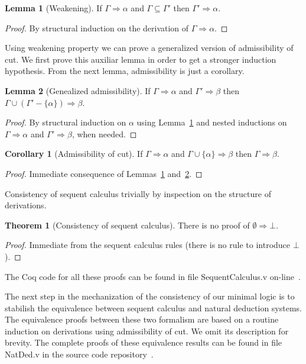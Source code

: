 \documentclass[12pt]{article}
\theoremstyle{definition}
\newtheorem{Theorem}{Theorem}
\newtheorem{Corollary}{Corollary}
\newtheorem{Lemma}{Lemma}
\begin{document}
\begin{Lemma}[Weakening]\label{lemma:weak}
  If $\Gamma \Rightarrow \alpha$ and $\Gamma \subseteq \Gamma'$ then $\Gamma'
  \Rightarrow \alpha$.
\end{Lemma}
\begin{proof}
  By structural induction on the derivation of $\Gamma \Rightarrow \alpha$.
\end{proof}

Using weakening property we can prove a generalized version of admissibility of
cut. We first prove this auxiliar lemma in order to get a stronger induction
hypothesis. From the next lemma, admissibility is just a corollary.

\begin{Lemma}[Genealized admissibility]\label{lemma:admissibility}
  If $\Gamma \Rightarrow \alpha$ and $\Gamma' \Rightarrow \beta$ then $\Gamma
  \cup (\Gamma' - \{\alpha\}) \Rightarrow \beta$.
\end{Lemma}
\begin{proof}
  By structural induction on $\alpha$ using Lemma~\ref{lemma:weak} and
  nested inductions on $\Gamma \Rightarrow \alpha$ and
  $\Gamma' \Rightarrow \beta$, when needed.
\end{proof}

\begin{Corollary}[Admissibility of cut]
  If $\Gamma \Rightarrow \alpha$ and $\Gamma \cup\{\alpha\}\Rightarrow \beta$
  then $\Gamma \Rightarrow \beta$.
\end{Corollary}
\begin{proof}
  Immediate consequence of Lemmas~\ref{lemma:weak} and~\ref{lemma:admissibility}.
\end{proof}

Consistency of sequent calculus trivially by inspection on the structure of
derivations.

\begin{Theorem}[Consistency of sequent calculus]\label{theorem:consistency}
  There is no proof of $\emptyset \Rightarrow \bot$.
\end{Theorem}
\begin{proof}
  Immediate from the sequent calculus rules (there is no rule to introduce $\bot$).
\end{proof}

The Coq code for all these proofs can be found in file SequentCalculus.v
on-line~\cite{Sasdelli20}.

The next step in the mechanization of the
consistency of our minimal logic is to stabilish the equivalence between sequent
calculus and natural deduction systems. The equivalence proofs between these two
formalism are based on a routine induction on derivations using admissibility of
cut. We omit its description for brevity. The complete proofs of these
equivalence results can be found in file NatDed.v in the source code
repository~\cite{Sasdelli20}.
\end{document}
